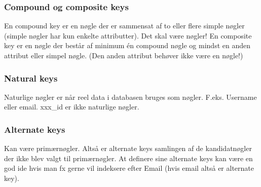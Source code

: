 \subsubsection{Compound og composite keys}
En compound key er en nøgle der er sammensat af to eller flere simple nøgler (simple nøgler har kun enkelte attributter). Det skal være nøgler!
En composite key er en nøgle der består af minimum én compound nøgle og mindst en anden attribut eller simpel nøgle. (Den anden attribut behøver ikke være en nøgle!)

\subsubsection{Natural keys}
Naturlige nøgler er når reel data i databasen bruges som nøgler. F.eks. Username eller email. xxx\_id er ikke naturlige nøgler.

\subsubsection{Alternate keys}
Kan være primærnøgler. Altså er alternate keys samlingen af de kandidatnøgler der ikke blev valgt til primærnøgler. At definere sine alternate keys kan være en god ide hvis man fx gerne vil indeksere efter Email (hvis email altså er alternate key).